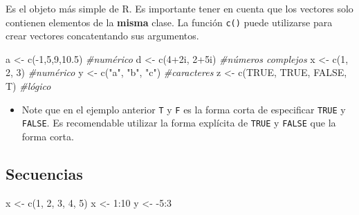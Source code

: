 \documentclass[
]{book}
\newenvironment{Shaded}{\begin{snugshade}}{\end{snugshade}}
\newcommand{\CommentTok}[1]{\textcolor[rgb]{0.56,0.35,0.01}{\textit{#1}}}
\newcommand{\ConstantTok}[1]{\textcolor[rgb]{0.00,0.00,0.00}{#1}}
\newcommand{\DecValTok}[1]{\textcolor[rgb]{0.00,0.00,0.81}{#1}}
\newcommand{\FloatTok}[1]{\textcolor[rgb]{0.00,0.00,0.81}{#1}}
\newcommand{\FunctionTok}[1]{\textcolor[rgb]{0.00,0.00,0.00}{#1}}
\newcommand{\NormalTok}[1]{#1}
\newcommand{\OtherTok}[1]{\textcolor[rgb]{0.56,0.35,0.01}{#1}}
\newcommand{\SpecialCharTok}[1]{\textcolor[rgb]{0.00,0.00,0.00}{#1}}
\newcommand{\StringTok}[1]{\textcolor[rgb]{0.31,0.60,0.02}{#1}}
\newenvironment{rmdblock}[1]
{\begin{shaded*}
		\begin{itemize}
			\renewcommand{\labelitemi}{
				\raisebox{-.7\height}[0pt][0pt]{
					{\setkeys{Gin}{width=3em,keepaspectratio}\texttt{[image: images/\#1]}}
				}
			}
			\item
		}
		{
		\end{itemize}
	\end{shaded*}
}
\newenvironment{rmdnote}
{\begin{rmdblock}{note}}
	{\end{rmdblock}}
\begin{document}
Es el objeto más simple de R. Es importante tener en cuenta que los vectores solo contienen elementos de la \textbf{misma} clase. La función \texttt{c()} puede utilizarse para crear vectores concatentando sus argumentos.

\begin{Shaded}
\begin{Highlighting}[]
\NormalTok{a }\OtherTok{\textless{}{-}} \FunctionTok{c}\NormalTok{(}\SpecialCharTok{{-}}\DecValTok{1}\NormalTok{,}\DecValTok{5}\NormalTok{,}\DecValTok{9}\NormalTok{,}\FloatTok{10.5}\NormalTok{)           }\CommentTok{\#numérico}
\NormalTok{d }\OtherTok{\textless{}{-}} \FunctionTok{c}\NormalTok{(}\DecValTok{4}\SpecialCharTok{+}\NormalTok{2i, }\DecValTok{2}\SpecialCharTok{+}\NormalTok{5i)            }\CommentTok{\#números complejos}
\NormalTok{x }\OtherTok{\textless{}{-}} \FunctionTok{c}\NormalTok{(}\DecValTok{1}\NormalTok{, }\DecValTok{2}\NormalTok{, }\DecValTok{3}\NormalTok{)               }\CommentTok{\#numérico}
\NormalTok{y }\OtherTok{\textless{}{-}} \FunctionTok{c}\NormalTok{(}\StringTok{"a"}\NormalTok{, }\StringTok{"b"}\NormalTok{, }\StringTok{"c"}\NormalTok{)         }\CommentTok{\#caracteres}
\NormalTok{z }\OtherTok{\textless{}{-}} \FunctionTok{c}\NormalTok{(}\ConstantTok{TRUE}\NormalTok{, }\ConstantTok{TRUE}\NormalTok{, }\ConstantTok{FALSE}\NormalTok{, T)  }\CommentTok{\#lógico}
\end{Highlighting}
\end{Shaded}

\begin{rmdnote}
Note que en el ejemplo anterior \texttt{T} y \texttt{F} es la forma
corta de especificar \texttt{TRUE} y \texttt{FALSE}. Es recomendable
utilizar la forma explícita de \texttt{TRUE} y \texttt{FALSE} que la
forma corta.
\end{rmdnote}

\hypertarget{secuencias}{%
\subsection{Secuencias}\label{secuencias}}

\begin{Shaded}
\begin{Highlighting}[]
\NormalTok{x }\OtherTok{\textless{}{-}} \FunctionTok{c}\NormalTok{(}\DecValTok{1}\NormalTok{, }\DecValTok{2}\NormalTok{, }\DecValTok{3}\NormalTok{, }\DecValTok{4}\NormalTok{, }\DecValTok{5}\NormalTok{)}
\NormalTok{x }\OtherTok{\textless{}{-}} \DecValTok{1}\SpecialCharTok{:}\DecValTok{10}
\NormalTok{y }\OtherTok{\textless{}{-}} \SpecialCharTok{{-}}\DecValTok{5}\SpecialCharTok{:}\DecValTok{3}
\end{Highlighting}
\end{Shaded}
\end{document}
